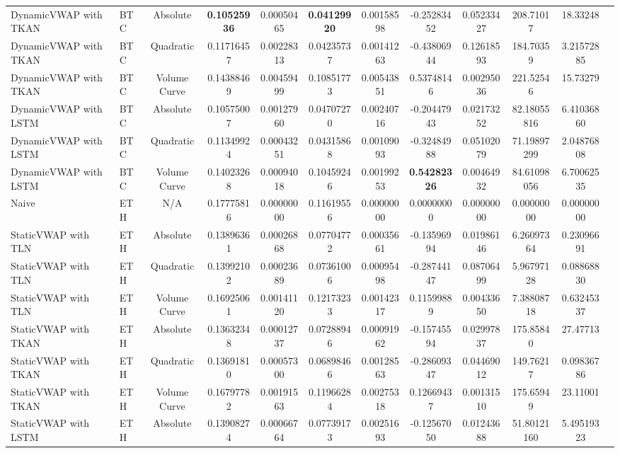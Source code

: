 \begin{table}[H]
{\begin{tabular}{llcccccccccc}
        DynamicVWAP with TKAN & BTC & Absolute & \textbf{0.10525936} & 0.00050465 & \textbf{0.04129920} & 0.00158598 & -0.25283452 & 0.05233427 & 208.71017 & 18.33248 \\
        DynamicVWAP with TKAN & BTC & Quadratic & 0.11716457 & 0.00228313 & 0.04235737 & 0.00141263 & -0.43806944 & 0.12618593 & 184.70359 & 3.21572885 \\
        DynamicVWAP with TKAN & BTC & Volume Curve & 0.14388469 & 0.00459499 & 0.10851773 & 0.00543851 & 0.53748146 & 0.00295036 & 221.52546 & 15.73279 \\
        DynamicVWAP with LSTM & BTC & Absolute & 0.10575007 & 0.00127960 & 0.04707270 & 0.00240716 & -0.20447943 & 0.02173252 & 82.18055816 & 6.41036860 \\
        DynamicVWAP with LSTM & BTC & Quadratic & 0.11349924 & 0.00043251 & 0.04315868 & 0.00109093 & -0.32484988 & 0.05102079 & 71.19897299 & 2.04876808 \\
        DynamicVWAP with LSTM & BTC & Volume Curve & 0.14023268 & 0.00094018 & 0.10459246 & 0.00199253 & \textbf{0.54282326} & 0.00464932 & 84.61098056 & 6.70062535 \\
        \hline
        Naive & ETH & N/A & 0.17775816 & 0.00000000 & 0.11619556 & 0.00000000 & 0.00000000 & 0.00000000 & 0.00000000 & 0.00000000 \\
        StaticVWAP with TLN & ETH & Absolute & 0.13896361 & 0.00026868 & 0.07704772 & 0.00035661 & -0.13596994 & 0.01986146 & 6.26097364 & 0.23096691 \\
        StaticVWAP with TLN & ETH & Quadratic & 0.13992102 & 0.00023689 & 0.07361006 & 0.00095498 & -0.28744147 & 0.08706499 & 5.96797128 & 0.08868830 \\
        StaticVWAP with TLN & ETH & Volume Curve & 0.16925061 & 0.00141120 & 0.12173233 & 0.00142317 & 0.11599889 & 0.00433650 & 7.38808718 & 0.63245337 \\
        StaticVWAP with TKAN & ETH & Absolute & 0.13632348 & 0.00012737 & 0.07288946 & 0.00091962 & -0.15745594 & 0.02997837 & 175.85840 & 27.47713 \\
        StaticVWAP with TKAN & ETH & Quadratic & 0.13691810 & 0.00057300 & 0.06898466 & 0.00128563 & -0.28609347 & 0.04469012 & 149.76217 & 0.09836786 \\
        StaticVWAP with TKAN & ETH & Volume Curve & 0.16797782 & 0.00191563 & 0.11966284 & 0.00275318 & 0.12669437 & 0.00131510 & 175.65949 & 23.11001 \\
        StaticVWAP with LSTM & ETH & Absolute & 0.13908274 & 0.00066764 & 0.07739173 & 0.00251693 & -0.12567050 & 0.01243688 & 51.80121160 & 5.49519323 \\

\end{tabular}}
\end{table}
